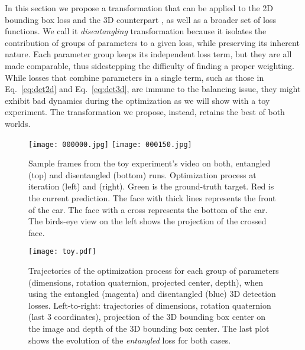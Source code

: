 \documentclass[10pt,twocolumn,letterpaper]{article}
\begin{document}
In this section we propose a transformation that can be applied to the 2D bounding box loss  and the 3D counterpart , as well as a broader set of loss functions.
We call it \emph{disentangling} transformation because it isolates the contribution of groups of parameters to a given loss, while preserving its inherent nature. Each parameter group keeps its independent loss term, but they are all made comparable, thus sidestepping the difficulty of finding a proper weighting. While losses that combine parameters in a single term, such as those in Eq.~\eqref{eq:det2d} and Eq.~\eqref{eq:det3d}, are immune to the balancing issue, they might exhibit bad dynamics during the optimization as we will show with a toy experiment. The transformation we propose, instead, retains the best of both worlds.
\begin{figure*}[t]
    \centering
    \texttt{[image: 000000.jpg]}
    \texttt{[image: 000150.jpg]}
    \caption{Sample frames from the toy experiment's video on both, entangled (top) and disentangled (bottom) runs. Optimization process at iteration  (left) and  (right). Green is the ground-truth target. Red is the current prediction. The face with thick lines represents the front of the car. The face with a cross represents the bottom of the car. The birds-eye view on the left shows the projection of the crossed face.}
    \label{fig:video}
    \vspace{-10pt}
\end{figure*}
\begin{figure*}
    \centering
    \texttt{[image: toy.pdf]}
    \caption{Trajectories of the optimization process for each group of parameters (dimensions, rotation quaternion, projected center, depth), when using the entangled (magenta) and disentangled (blue) 3D detection losses. Left-to-right: trajectories of dimensions, rotation quaternion (last 3 coordinates), projection of the 3D bounding box center on the image and depth of the 3D bounding box center. The last plot shows the evolution of the \emph{entangled}  loss for both cases.   }
    \label{fig:toy}
    \vspace{-10pt}
\end{figure*}
\end{document}

